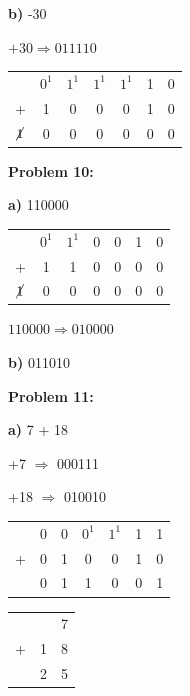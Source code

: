 \documentclass{article}
\begin{document}
    \quad \textbf{b)} -30

    \quad\quad $+30 \Rightarrow 011110$

    \begin{center}
        \begin{tabular}{ ccccccc }
              & $0^1$ & $1^1$ & $1^1$ & $1^1$ & 1 & 0 \\
            + & 1 & 0 & 0 & 0 & 1 & 0  \\
            \hline
            $\cancel{1}$ & 0 & 0 & 0 & 0 & 0 & 0 
        \end{tabular}
    \end{center}

    \quad\quad {}

    \textbf{Problem 10:}

    \quad \textbf{a)} 110000

    \begin{center}
        \begin{tabular}{ ccccccc }
              & $0^1$ & $1^1$ & 0 & 0 & 1 & 0 \\
            + & 1 & 1 & 0 & 0 & 0 & 0  \\
            \hline
            $\cancel{1}$ & 0 & 0 & 0 & 0 & 0 & 0 
        \end{tabular}
    \end{center}

    \quad\quad $110000 \Rightarrow 010000$

    \quad\quad {}

    \quad \textbf{b)} 011010

    \quad\quad {}

    \textbf{Problem 11:}

    \quad \textbf{a)} 7 + 18

    \quad\quad +7 $\Rightarrow$ 000111

    \quad\quad +18 $\Rightarrow$ 010010

    \begin{center}
        \begin{tabular}{ ccccccc }
              & 0 & 0 & $0^1$ & $1^1$ & 1 & 1 \\
            + & 0 & 1 & 0 & 0 & 1 & 0  \\
            \hline
            & 0 & 1 & 1 & 0 & 0 & 1
        \end{tabular}
        \quad\quad 
        \begin{tabular}{ ccc }
            & & 7 \\
            + & 1 & 8 \\
            \hline
            & 2 & 5
        \end{tabular}
    \end{center}
\end{document}
